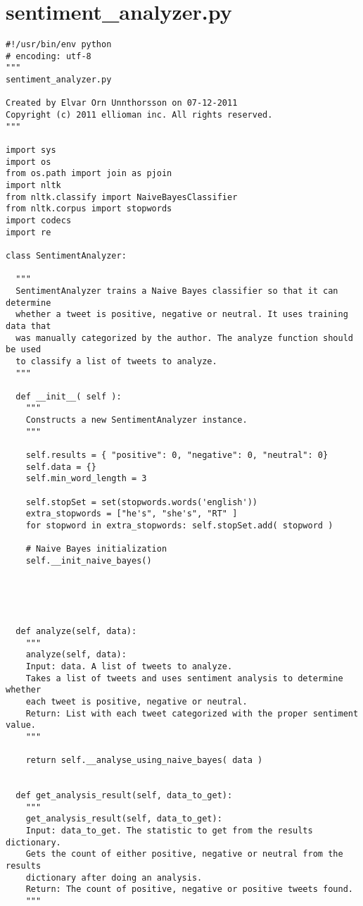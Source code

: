 \section{sentiment\_analyzer.py} \label{sec:SentimentAnalyzer}
\begin{verbatim}
#!/usr/bin/env python
# encoding: utf-8
"""
sentiment_analyzer.py

Created by Elvar Orn Unnthorsson on 07-12-2011
Copyright (c) 2011 ellioman inc. All rights reserved.
"""

import sys
import os
from os.path import join as pjoin
import nltk
from nltk.classify import NaiveBayesClassifier
from nltk.corpus import stopwords
import codecs
import re

class SentimentAnalyzer:

  """
  SentimentAnalyzer trains a Naive Bayes classifier so that it can determine
  whether a tweet is positive, negative or neutral. It uses training data that
  was manually categorized by the author. The analyze function should be used
  to classify a list of tweets to analyze.
  """

  def __init__( self ):
    """
    Constructs a new SentimentAnalyzer instance.
    """

    self.results = { "positive": 0, "negative": 0, "neutral": 0}
    self.data = {}
    self.min_word_length = 3

    self.stopSet = set(stopwords.words('english'))
    extra_stopwords = ["he's", "she's", "RT" ]
    for stopword in extra_stopwords: self.stopSet.add( stopword )

    # Naive Bayes initialization
    self.__init_naive_bayes()





  def analyze(self, data):
    """
    analyze(self, data):
    Input: data. A list of tweets to analyze.
    Takes a list of tweets and uses sentiment analysis to determine whether 
    each tweet is positive, negative or neutral.
    Return: List with each tweet categorized with the proper sentiment value.
    """

    return self.__analyse_using_naive_bayes( data )


  def get_analysis_result(self, data_to_get):
    """
    get_analysis_result(self, data_to_get):
    Input: data_to_get. The statistic to get from the results dictionary.
    Gets the count of either positive, negative or neutral from the results 
    dictionary after doing an analysis. 
    Return: The count of positive, negative or positive tweets found.
    """


\end{verbatim}

